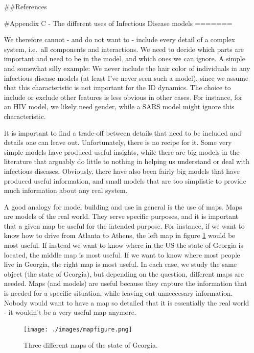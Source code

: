 \documentclass[]{book}
\theoremstyle{definition}
\theoremstyle{definition}
\theoremstyle{definition}
\theoremstyle{remark}
\begin{document}
\#\#References

\#Appendix C - The different uses of Infectious Disease models
=======

We therefore cannot - and do not want to - include every detail of a
complex system, i.e.~all components and interactions. We need to decide
which parts are important and need to be in the model, and which ones we
can ignore. A simple and somewhat silly example: We never include the
hair color of individuals in any infectious disease models (at least
I've never seen such a model), since we assume that this characteristic
is not important for the ID dynamics. The choice to include or exclude
other features is less obvious in other cases. For instance, for an HIV
model, we likely need gender, while a SARS model might ignore this
characteristic.

It is important to find a trade-off between details that need to be
included and details one can leave out. Unfortunately, there is no
recipe for it. Some very simple models have produced useful insights,
while there are big models in the literature that arguably do little to
nothing in helping us understand or deal with infectious diseases.
Obviously, there have also been fairly big models that have produced
useful information, and small models that are too simplistic to provide
much information about any real system.

A good analogy for model building and use in general is the use of maps.
Maps are models of the real world. They serve specific purposes, and it
is important that a given map be useful for the intended purpose. For
instance, if we want to know how to drive from Atlanta to Athens, the
left map in figure \ref{fig:mapfigure} would be most useful. If instead
we want to know where in the US the state of Georgia is located, the
middle map is most useful. If we want to know where most people live in
Georgia, the right map is most useful. In each case, we study the same
object (the state of Georgia), but depending on the question, different
maps are needed. Maps (and models) are useful because they capture the
information that is needed for a specific situation, while leaving out
unneccesary information. Nobody would want to have a map so detailed
that it is essentially the real world - it wouldn't be a very useful map
anymore.

\begin{figure}
\centering
\texttt{[image: ./images/mapfigure.png]}
\caption{\label{fig:mapfigure}Three different maps of the state of Georgia.}
\end{figure}
\end{document}
